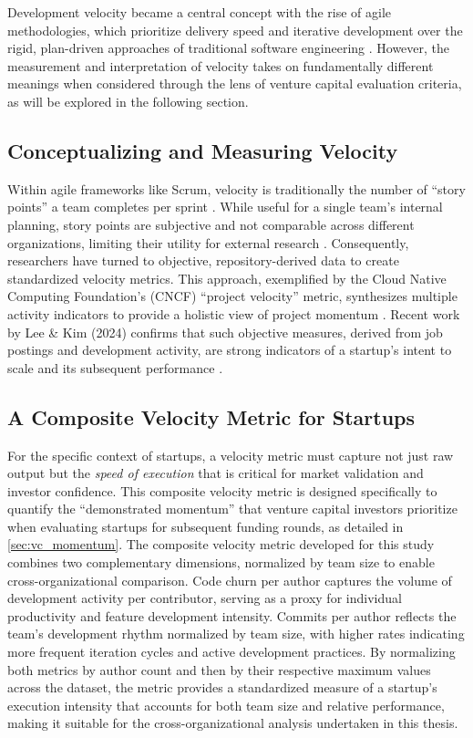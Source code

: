 Development velocity became a central concept with the rise of agile methodologies, which prioritize delivery speed and iterative development over the rigid, plan-driven approaches of traditional software engineering \citep{beck2001agile}. However, the measurement and interpretation of velocity takes on fundamentally different meanings when considered through the lens of venture capital evaluation criteria, as will be explored in the following section.

\subsection{Conceptualizing and Measuring Velocity}

Within agile frameworks like Scrum, velocity is traditionally the number of ``story points'' a team completes per sprint \citep{sutherland2004agile}. While useful for a single team's internal planning, story points are subjective and not comparable across different organizations, limiting their utility for external research \citep{cohn2005agile}. Consequently, researchers have turned to objective, repository-derived data to create standardized velocity metrics. This approach, exemplified by the Cloud Native Computing Foundation's (CNCF) ``project velocity'' metric, synthesizes multiple activity indicators to provide a holistic view of project momentum \citep{cncf2022velocity}. Recent work by Lee \& Kim (2024) confirms that such objective measures, derived from job postings and development activity, are strong indicators of a startup's intent to scale and its subsequent performance \citep{lee2024startups}.

\subsection{A Composite Velocity Metric for Startups}

For the specific context of startups, a velocity metric must capture not just raw output but the \textit{speed of execution} that is critical for market validation and investor confidence. This composite velocity metric is designed specifically to quantify the ``demonstrated momentum'' that venture capital investors prioritize when evaluating startups for subsequent funding rounds, as detailed in \autoref{sec:vc_momentum}. The composite velocity metric developed for this study combines two complementary dimensions, normalized by team size to enable cross-organizational comparison. Code churn per author captures the volume of development activity per contributor, serving as a proxy for individual productivity and feature development intensity. Commits per author reflects the team's development rhythm normalized by team size, with higher rates indicating more frequent iteration cycles and active development practices. By normalizing both metrics by author count and then by their respective maximum values across the dataset, the metric provides a standardized measure of a startup's execution intensity that accounts for both team size and relative performance, making it suitable for the cross-organizational analysis undertaken in this thesis.

